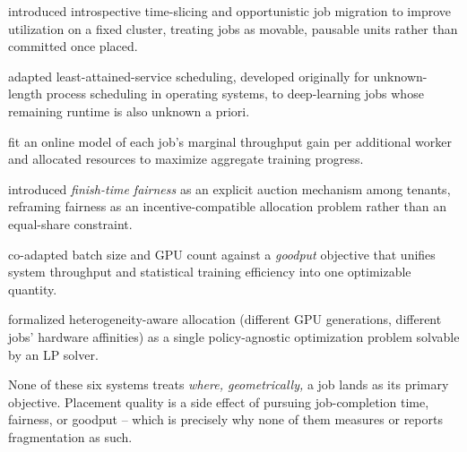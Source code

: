 \documentclass[12pt]{report}
\begin{document}
\begin{description}[leftmargin=1.6em]
\item[Gandiva \citep{gandiva2018}] introduced introspective time-slicing
  and opportunistic job migration to improve utilization on a fixed
  cluster, treating jobs as movable, pausable units rather than committed
  once placed.
\item[Tiresias \citep{tiresias2019}] adapted least-attained-service
  scheduling, developed originally for unknown-length process scheduling
  in operating systems, to deep-learning jobs whose remaining runtime is
  also unknown a priori.
\item[Optimus \citep{optimus2018}] fit an online model of each job's
  marginal throughput gain per additional worker and allocated resources
  to maximize aggregate training progress.
\item[Themis \citep{themis2020}] introduced \emph{finish-time fairness}
  as an explicit auction mechanism among tenants, reframing fairness as
  an incentive-compatible allocation problem rather than an equal-share
  constraint.
\item[Pollux \citep{pollux2021}] co-adapted batch size and GPU count
  against a \emph{goodput} objective that unifies system throughput and
  statistical training efficiency into one optimizable quantity.
\item[Gavel \citep{gavel2020}] formalized heterogeneity-aware allocation
  (different GPU generations, different jobs' hardware affinities) as a
  single policy-agnostic optimization problem solvable by an LP solver.
\end{description}

None of these six systems treats \emph{where, geometrically,} a job lands
as its primary objective. Placement quality is a side effect of pursuing
job-completion time, fairness, or goodput -- which is precisely why none
of them measures or reports fragmentation as such.
\end{document}
